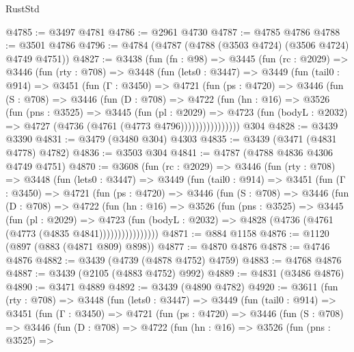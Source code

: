 \begin{lexlean}{RustStd}
\begin{coremodule}
@4785 := @3497 @4781
@4786 := @2961 @4730
@4787 := @4785 @4786
@4788 := @3501 @4786
@4796 := @4784 (@4787 (@4788 (@3503 @4724) (@3506 @4724) @4749 @4751))
@4827 := @3438
    (fun (fn : @98) =>
    @3445
      (fun (rc : @2029) =>
      @3446
        (fun (rty : @708) =>
        @3448
          (fun (lets0 : @3447) =>
          @3449
            (fun (tail0 : @914) =>
            @3451
              (fun (Γ : @3450) =>
              @4721
                (fun (ps : @4720) =>
                @3446
                  (fun (S : @708) =>
                  @3446
                    (fun (D : @708) =>
                    @4722
                      (fun (hn : @16) =>
                      @3526
                        (fun (pns : @3525) =>
                        @3445
                          (fun (pl : @2029) =>
                          @4723
                            (fun (bodyL : @2032) => @4727 (@4736 (@4761 (@4773 @4796))))))))))))))))
    @304
@4828 := @3439 @3390
@4831 := @3479 (@3480 @304) @4303
@4835 := @3439 (@3471 (@4831 @4778) @4782)
@4836 := @3503 @304
@4841 := @4787 (@4788 @4836 @4306 @4749 @4751)
@4870 := @3608
    (fun (rc : @2029) =>
    @3446
      (fun (rty : @708) =>
      @3448
        (fun (lets0 : @3447) =>
        @3449
          (fun (tail0 : @914) =>
          @3451
            (fun (Γ : @3450) =>
            @4721
              (fun (ps : @4720) =>
              @3446
                (fun (S : @708) =>
                @3446
                  (fun (D : @708) =>
                  @4722
                    (fun (hn : @16) =>
                    @3526
                      (fun (pns : @3525) =>
                      @3445
                        (fun (pl : @2029) =>
                        @4723
                          (fun (bodyL : @2032) =>
                          @4828 (@4736 (@4761 (@4773 (@4835 @4841))))))))))))))))
@4871 := @884 @1158
@4876 := @1120 (@897 (@883 (@4871 @809) @898))
@4877 := @4870 @4876
@4878 := @4746 @4876
@4882 := @3439 (@4739 (@4878 @4752) @4759)
@4883 := @4768 @4876
@4887 := @3439 (@2105 (@4883 @4752) @992)
@4889 := @4831 (@3486 @4876)
@4890 := @3471 @4889
@4892 := @3439 (@4890 @4782)
@4920 := @3611
    (fun (rty : @708) =>
    @3448
      (fun (lets0 : @3447) =>
      @3449
        (fun (tail0 : @914) =>
        @3451
          (fun (Γ : @3450) =>
          @4721
            (fun (ps : @4720) =>
            @3446
              (fun (S : @708) =>
              @3446
                (fun (D : @708) =>
                @4722
                  (fun (hn : @16) =>
                  @3526
                    (fun (pns : @3525) =>

\end{coremodule}
\end{lexlean}
